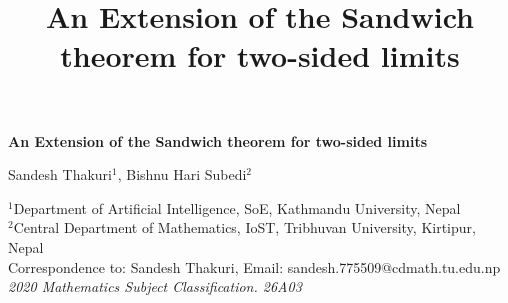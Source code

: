 \documentclass[a4paper,twoside,12pt]{article}
\title{\bfseries An Extension of the Sandwich theorem for two-sided limits}
\theoremstyle{plain}
\theoremstyle{definition}
\theoremstyle{theorem}
\begin{document}
\linenumbers
\vspace{2mm}
{\Large
\begin{center}
\bf{\LARGE \bfseries An Extension of the Sandwich theorem for two-sided limits}
\end{center}}
\begin{center}
Sandesh Thakuri$^{1}$, Bishnu Hari Subedi$^{2}$
\end{center}

\begin{center}
{\footnotesize
  $^{1}$Department of Artificial Intelligence, SoE, Kathmandu University, Nepal \\[1mm]
 \(^{2}\)Central Department of Mathematics, IoST, Tribhuvan University, Kirtipur, Nepal \\[2mm]
 Correspondence to: Sandesh Thakuri, Email: sandesh.775509@cdmath.tu.edu.np \\[1mm]
\textit{2020 Mathematics Subject Classification. 26A03}
}
\end{center}
\end{document}
